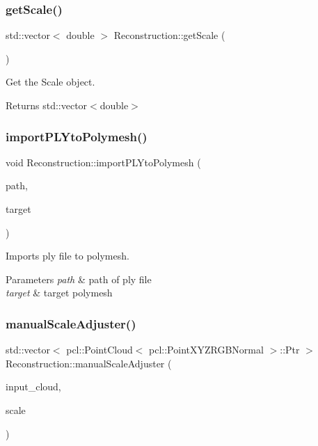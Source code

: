 \subsubsection{\texorpdfstring{get\+Scale()}{getScale()}}
{\footnotesize\ttfamily std\+::vector$<$ double $>$ Reconstruction\+::get\+Scale (\begin{DoxyParamCaption}{ }\end{DoxyParamCaption})}



Get the Scale object. 

\begin{DoxyReturn}{Returns}
std\+::vector$<$double$>$ 
\end{DoxyReturn}
\mbox{\label{classReconstruction_ac2d96a55242b1849637da44e4e32f725}} 
\subsubsection{\texorpdfstring{import\+P\+L\+Yto\+Polymesh()}{importPLYtoPolymesh()}}
{\footnotesize\ttfamily void Reconstruction\+::import\+P\+L\+Yto\+Polymesh (\begin{DoxyParamCaption}\item[{std\+::string}]{path,  }\item[{pcl\+::\+Polygon\+Mesh\+::\+Ptr \&}]{target }\end{DoxyParamCaption})}



Imports ply file to polymesh. 


\begin{DoxyParams}{Parameters}
{\em path} & path of ply file \\
\hline
{\em target} & target polymesh \\
\hline
\end{DoxyParams}
\mbox{\label{classReconstruction_a6c2151dd4224cee397adb2b353e20e9b}} 
\subsubsection{\texorpdfstring{manual\+Scale\+Adjuster()}{manualScaleAdjuster()}}
{\footnotesize\ttfamily std\+::vector$<$ pcl\+::\+Point\+Cloud$<$ pcl\+::\+Point\+X\+Y\+Z\+R\+G\+B\+Normal $>$\+::Ptr $>$ Reconstruction\+::manual\+Scale\+Adjuster (\begin{DoxyParamCaption}\item[{pcl\+::\+Point\+Cloud$<$ pcl\+::\+Point\+X\+Y\+Z\+R\+G\+B\+Normal $>$\+::Ptr \&}]{input\+\_\+cloud,  }\item[{double}]{scale }\end{DoxyParamCaption})}



